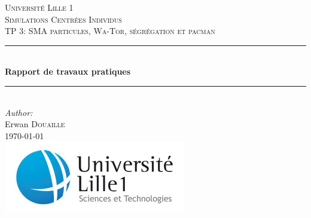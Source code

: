 \makeatletter

\begin{titlepage}

\newcommand{\HRule}{\rule{\linewidth}{0.5mm}} %

\center %
 

\textsc{\LARGE Université Lille 1}\\[1.5cm] %
\vspace{7em}
\textsc{\Large Simulations Centrées Individus }\\[0.5cm] %
\textsc{\large TP 3: SMA particules, Wa-Tor, ségrégation et pacman}\\[0.5cm] %


\vspace{1em}
\HRule \\[0.4cm]
{ \huge \bfseries Rapport de travaux pratiques}\\[0.1cm] %
\HRule \\[2cm]
 

\Large \emph{Author:}\\
Erwan \textsc{Douaille}\\[1cm] %


{\large \today}\\[3cm] %


\includegraphics[scale=0.6]{image/ustl1.jpg}
 

\vfill %

\end{titlepage}
\makeatother

\sloppy